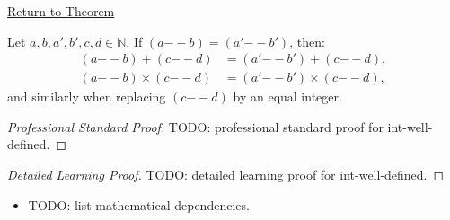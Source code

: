 \newpage
{}
\label{prf:int-well-defined}

\begin{remark*}[Return]
\hyperref[lem:int-well-defined]{Return to Theorem}
\end{remark*}

\begin{theorem*}
Let $a, b, a', b', c, d \in \mathbb{N}$.
If $(a {-\!\!-} b) = (a' {-\!\!-} b')$, then:
\begin{align*}
(a {-\!\!-} b) + (c {-\!\!-} d) &= (a' {-\!\!-} b') + (c {-\!\!-} d), \\
(a {-\!\!-} b) \times (c {-\!\!-} d) &= (a' {-\!\!-} b') \times (c {-\!\!-} d),
\end{align*}
and similarly when replacing $(c {-\!\!-} d)$ by an equal integer.
\end{theorem*}

\begin{proof}[Professional Standard Proof]
\LRAProofBodyStart
TODO: professional standard proof for int-well-defined.
\end{proof}

\begin{proof}[Detailed Learning Proof]
\LRAProofBodyStart
TODO: detailed learning proof for int-well-defined.
\end{proof}

\begin{remark*}
\end{remark*}

\begin{dependencies}
\begin{itemize}
  \item TODO: list mathematical dependencies.
\end{itemize}
\end{dependencies}

\clearpage
